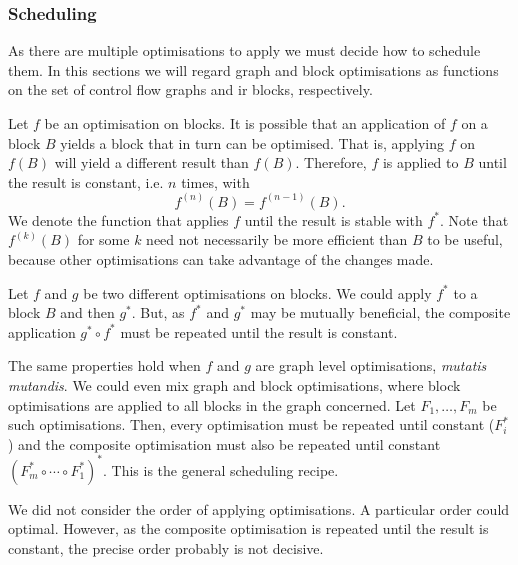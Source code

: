 \subsubsection*{Scheduling}
As there are multiple optimisations to apply we must decide how to schedule them. In this sections we will regard graph and block optimisations as functions on the set of control flow graphs and ir blocks, respectively.

Let $f$ be an optimisation on blocks. It is possible that an application of $f$ on a block $B$ yields a block that in turn can be optimised. That is, applying $f$ on $f(B)$ will yield a different result than $f(B)$. Therefore, $f$ is applied to $B$ until the result is constant, i.e. $n$ times, with $$f^{(n)}(B) = f^{(n-1)}(B).$$ We denote the function that applies $f$ until the result is stable with $f^*$. Note that $f^{(k)}(B)$ for some $k$ need not necessarily be more efficient than $B$ to be useful, because other optimisations can take advantage of the changes made.

Let $f$ and $g$ be two different optimisations on blocks. We could apply $f^*$ to a block $B$ and then $g^*$. But, as $f^*$ and $g^*$ may be mutually beneficial, the composite application $g^* \circ f^*$ must be repeated until the result is constant.

The same properties hold when $f$ and $g$ are graph level optimisations, \emph{mutatis mutandis}. We could even mix graph and block optimisations, where block optimisations are applied to all blocks in the graph concerned. Let $F_1, \ldots, F_m$ be such optimisations. Then, every optimisation must be repeated until constant ($F_i^*$) and the composite optimisation must also be repeated until constant ${(F_m^* \circ \cdots \circ F_1^*)}^*$. This is the general scheduling recipe.

We did not consider the order of applying optimisations. A particular order could optimal. However, as the composite optimisation is repeated until the result is constant, the precise order probably is not decisive.


